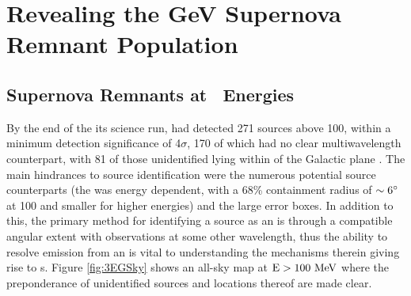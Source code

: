 \chapter{Revealing the GeV Supernova Remnant Population}
\label{chap:snrCat}


\section{\label{snrCat:latGam}Supernova Remnants at \gam~Energies}

By the end of the its science run, \egret{} had detected 271 sources above 100\mev{}, within a minimum detection significance of 4$\sigma$, 170 of which had no clear multiwavelength counterpart, with 81 of those unidentified lying within \blat of the Galactic plane \citep{Hartman99}. The main hindrances to source identification were the numerous potential source counterparts (the \egret{} \psf{} was energy dependent, with a 68\% containment radius of ${\rm \sim 6 ^\circ}$ at 100\mev{} and smaller for higher energies) and the large \egret{} error boxes. In addition to this, the primary method for identifying a \gam{} source as an \snr{} is through a compatible angular extent with  observations at some other wavelength, thus the ability to resolve emission from an \snr{} is vital to understanding the mechanisms therein giving rise to \gam{}s. Figure \ref{fig:3EGSky} shows an \egret{} all-sky map at ${\rm E > 100 ~\mathrm{MeV}}$ where the preponderance of unidentified sources and locations thereof are made clear.



